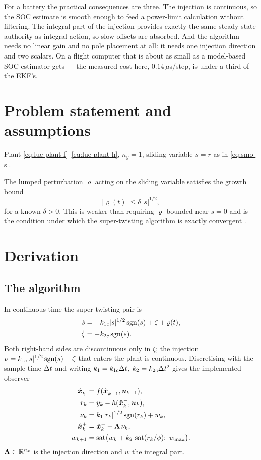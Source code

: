For a battery the practical consequences are three.  The injection is continuous, so the SOC
estimate is smooth enough to feed a power-limit calculation without filtering.  The integral part
of the injection provides exactly the same steady-state authority as integral action, so slow
offsets are absorbed.  And the algorithm needs no linear gain and no pole placement at all: it
needs one injection direction and two scalars.  On a flight computer that is about as small as a
model-based SOC estimator gets --- the measured cost here, $0.14\,\mu$s/step, is under a third of
the EKF's.

\section{Problem statement and assumptions}
Plant \eqref{eq:lue-plant-f}--\eqref{eq:lue-plant-h}, $n_y=1$, sliding variable $s = r$ as in
\eqref{eq:smo-s}.
\begin{assumption}\label{as:sto-pert}
The lumped perturbation $\varrho$ acting on the sliding variable satisfies the growth bound
\begin{equation}
|\varrho(t)| \le \delta\,|s|^{1/2} ,
\label{eq:sto-growth}
\end{equation}
for a known $\delta>0$.  This is weaker than requiring $\varrho$ bounded near $s=0$ and is the
condition under which the super-twisting algorithm is exactly convergent
\cite{moreno2008}.
\end{assumption}

\section{Derivation}

\subsection{The algorithm}
In continuous time the super-twisting pair is
\begin{align}
\dot{s} &= -k_{1c}|s|^{1/2}\operatorname{sgn}(s) + \zeta + \varrho(t) , \label{eq:sto-c1}\\
\dot{\zeta} &= -k_{2c}\operatorname{sgn}(s) . \label{eq:sto-c2}
\end{align}
Both right-hand sides are discontinuous only in $\dot\zeta$; the injection
$\nu = k_{1c}|s|^{1/2}\operatorname{sgn}(s) + \zeta$ that enters the plant is continuous.  Discretising with
the sample time $\Delta t$ and writing $k_1 = k_{1c}\Delta t$, $k_2 = k_{2c}\Delta t^2$ gives the implemented
observer
\begin{align}
\xminus_k &= f(\xplus_{k-1},\vu_{k-1}) , \label{eq:sto-pred}\\
r_k &= y_k - h(\xminus_k,\vu_k) , \label{eq:sto-res}\\
\nu_k &= k_1|r_k|^{1/2}\sgn(r_k) + w_k , \label{eq:sto-nu}\\
\xplus_k &= \xminus_k + \bm{\Lambda}\,\nu_k , \label{eq:sto-upd}\\
w_{k+1} &= \operatorname{sat}\!\big(w_k + k_2\,\sat(r_k/\phi);\ w_{\max}\big) . \label{eq:sto-w}
\end{align}
$\bm{\Lambda}\in\mathbb{R}^{n_x}$ is the injection direction and $w$ the integral part.


